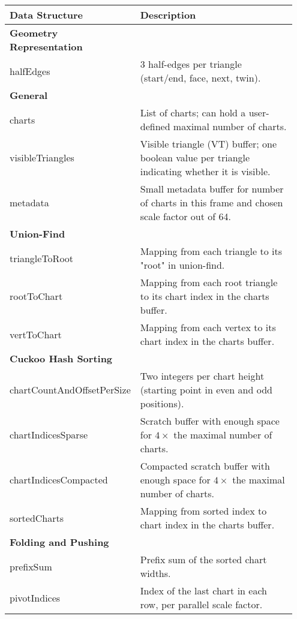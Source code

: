 \begin{table}[]
\scriptsize
\setlength{\tabcolsep}{2pt}
\centering
\begin{tabular}{p{0.3\linewidth} | p{0.65\linewidth}}
\textbf{Data Structure}          & \textbf{Description} \\
\hline
\textbf{Geometry Representation} & \\
halfEdges                        & 3 half-edges per triangle (start/end, face, next, twin). \\
\hline
\textbf{General}                 & \\
charts                           & List of charts; can hold a user-defined maximal number of charts. \\
visibleTriangles                 & Visible triangle (VT) buffer; one boolean value per triangle indicating whether it is visible. \\
metadata                         & Small metadata buffer for number of charts in this frame and chosen scale factor out of 64. \\
\hline
\textbf{Union-Find}              & \\
triangleToRoot                   & Mapping from each triangle to its "root" in union-find. \\
rootToChart                      & Mapping from each root triangle to its chart index in the charts buffer. \\
vertToChart                      & Mapping from each vertex to its chart index in the charts buffer. \\
\hline
\textbf{Cuckoo Hash Sorting}     & \\
chartCountAndOffsetPerSize       & Two integers per chart height (starting point in even and odd positions). \\
chartIndicesSparse               & Scratch buffer with enough space for $4\times$ the maximal number of charts. \\
chartIndicesCompacted            & Compacted scratch buffer with enough space for $4\times$ the maximal number of charts. \\
sortedCharts                     & Mapping from sorted index to chart index in the charts buffer. \\
\hline
\textbf{Folding and Pushing}     & \\
prefixSum                        & Prefix sum of the sorted chart widths. \\
pivotIndices                     & Index of the last chart in each row, per parallel scale factor. \\

\end{tabular}
\end{table}
